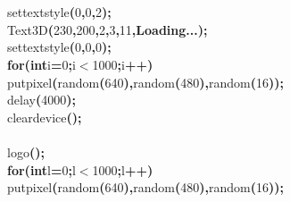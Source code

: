 \documentclass[a4paper, 10pt]{article}
\newcommand\SPC{\hspace*{0.6em}}
\newcommand\QOT{\mbox{\char 34}}
\newcommand{\CppAIdentifier}[1]{#1}
\newcommand{\CppANumber}[1]{\textcolor[rgb]{0.5,0,0.5}{#1}}
\newcommand{\CppAReservedWord}[1]{\textbf{#1}}
\newcommand{\CppASpace}[1]{\colorbox[rgb]{1,1,1}{#1}}
\newcommand{\CppAString}[1]{\textbf{\textcolor[rgb]{0,0,1}{#1}}}
\newcommand{\CppASymbol}[1]{\textbf{\textcolor[rgb]{1,0,0}{#1}}}
\begin{document}
\begin{ttfamily}
\\
\\
\CppASpace{\SPC \SPC \SPC }\CppAIdentifier{settextstyle}\CppASymbol{(}\CppANumber{0}\CppASymbol{,}\CppANumber{0}\CppASymbol{,}\CppANumber{2}\CppASymbol{)}\CppASymbol{;}\\
\CppASpace{\SPC \SPC \SPC }\CppAIdentifier{Text3D}\CppASymbol{(}\CppANumber{230}\CppASymbol{,}\CppANumber{200}\CppASymbol{,}\CppANumber{2}\CppASymbol{,}\CppANumber{3}\CppASymbol{,}\CppANumber{11}\CppASymbol{,}\CppAString{\QOT Loading...\QOT }\CppASymbol{)}\CppASymbol{;}\\
\CppASpace{\SPC \SPC \SPC }\CppAIdentifier{settextstyle}\CppASymbol{(}\CppANumber{0}\CppASymbol{,}\CppANumber{0}\CppASymbol{,}\CppANumber{0}\CppASymbol{)}\CppASymbol{;}\\
\CppASpace{\SPC \SPC \SPC }\CppAReservedWord{for}\CppASymbol{(}\CppAReservedWord{int}\CppASpace{\SPC }\CppAIdentifier{i}\CppASymbol{=}\CppANumber{0}\CppASymbol{;}\CppAIdentifier{i}\CppASymbol{$<$}\CppANumber{1000}\CppASymbol{;}\CppAIdentifier{i}\CppASymbol{++}\CppASymbol{)}\\
\CppASpace{\SPC }\CppAIdentifier{putpixel}\CppASymbol{(}\CppAIdentifier{random}\CppASymbol{(}\CppANumber{640}\CppASymbol{)}\CppASymbol{,}\CppAIdentifier{random}\CppASymbol{(}\CppANumber{480}\CppASymbol{)}\CppASymbol{,}\CppAIdentifier{random}\CppASymbol{(}\CppANumber{16}\CppASymbol{)}\CppASymbol{)}\CppASymbol{;}\\
\CppASpace{\SPC \SPC \SPC }\CppAIdentifier{delay}\CppASymbol{(}\CppANumber{4000}\CppASymbol{)}\CppASymbol{;}\\
\CppASpace{\SPC \SPC \SPC }\CppAIdentifier{cleardevice}\CppASymbol{(}\CppASymbol{)}\CppASymbol{;}\\
\\
\CppASpace{\SPC \SPC \SPC }\CppAIdentifier{logo}\CppASymbol{(}\CppASymbol{)}\CppASymbol{;}\\
\CppASpace{\SPC \SPC \SPC }\CppAReservedWord{for}\CppASymbol{(}\CppAReservedWord{int}\CppASpace{\SPC }\CppAIdentifier{l}\CppASymbol{=}\CppANumber{0}\CppASymbol{;}\CppAIdentifier{l}\CppASymbol{$<$}\CppANumber{1000}\CppASymbol{;}\CppAIdentifier{l}\CppASymbol{++}\CppASymbol{)}\\
\CppASpace{\SPC }\CppAIdentifier{putpixel}\CppASymbol{(}\CppAIdentifier{random}\CppASymbol{(}\CppANumber{640}\CppASymbol{)}\CppASymbol{,}\CppAIdentifier{random}\CppASymbol{(}\CppANumber{480}\CppASymbol{)}\CppASymbol{,}\CppAIdentifier{random}\CppASymbol{(}\CppANumber{16}\CppASymbol{)}\CppASymbol{)}\CppASymbol{;}\\

\end{ttfamily}
\end{document}
